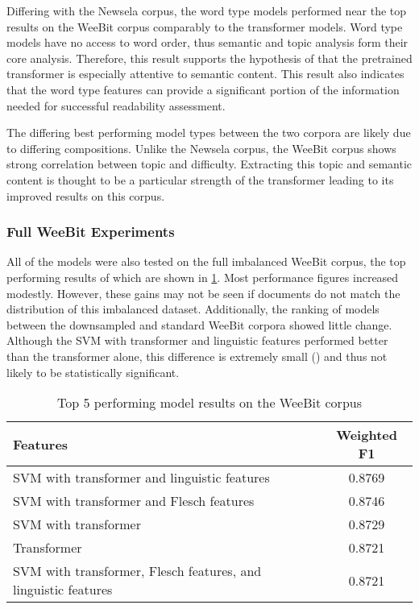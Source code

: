 \documentclass[11pt,a4paper]{article}
\theoremstyle{definition}
\begin{document}
Differing with the Newsela corpus, the word type models performed near the top results on the WeeBit corpus comparably to the transformer models. Word type models have no access to word order, thus semantic and topic analysis form their core analysis. Therefore, this result supports the hypothesis of \citet{martincSupervisedUnsupervisedNeural2019} that the pretrained transformer is especially attentive to semantic content. This result also indicates that the word type features can provide a significant portion of the information needed for successful readability assessment.

The differing best performing model types between the two corpora are likely due to differing compositions. Unlike the Newsela corpus, the WeeBit corpus shows strong correlation between topic and difficulty. Extracting this topic and semantic content is thought to be a particular strength of the transformer \citep{martincSupervisedUnsupervisedNeural2019}
leading to its improved results on this corpus. 

\subsubsection{Full WeeBit Experiments}

All of the models were also tested on the full imbalanced WeeBit corpus, the top performing results of which are shown in \cref{tab:weebitFullBest}. Most performance figures increased modestly. However, these gains may not be seen if documents do not match the distribution of this imbalanced dataset. Additionally, the ranking of models between the downsampled and standard WeeBit corpora showed little change. Although the SVM with transformer and linguistic features performed better than the transformer alone, this difference is extremely small () and thus not likely to be statistically significant.

\begin{table}
\begin{tabular}{p{5cm}c}
\rowcolor{white}
Features & Weighted F1\\
\hline
\rowcolor{transformer} SVM with transformer and linguistic features & 0.8769 \\
\rowcolor{transformer} SVM with transformer and Flesch features & 0.8746 \\
\rowcolor{transformer} SVM with transformer & 0.8729 \\
\rowcolor{transformer} Transformer & 0.8721 \\
\rowcolor{transformer} SVM with transformer, Flesch features, and linguistic features & 0.8721 \\
\end{tabular}
    \caption{Top 5 performing model results on the WeeBit corpus}
    \label{tab:weebitFullBest}
\end{table}
\end{document}
